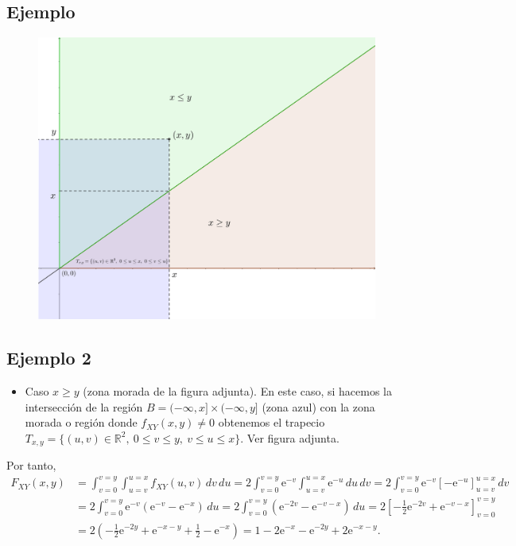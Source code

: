 \documentclass[]{book}
\providecommand{\tightlist}{%
  \setlength{\itemsep}{0pt}\setlength{\parskip}{0pt}}
\begin{document}
\hypertarget{ejemplo-53}{%
\subsection{Ejemplo}\label{ejemplo-53}}

\begin{figure}
\includegraphics[width=700px]{Images/Ejemplo2Bidi3} \end{figure}

\hypertarget{ejemplo-2-4}{%
\subsection{Ejemplo 2}\label{ejemplo-2-4}}

\begin{itemize}
\tightlist
\item
  Caso \(x\geq y\) (zona morada de la figura adjunta). En este caso, si hacemos la intersección de la región \(B=(-\infty,x]\times (-\infty,y]\) (zona azul) con la zona morada o región donde \(f_{XY}(x,y)\neq 0\) obtenemos el trapecio \(T_{x,y}=\{(u,v)\in\mathbb{R}^2,\ 0\leq v\leq y,\ v\leq u\leq x\}.\) Ver figura adjunta.
\end{itemize}

Por tanto,
\[
\begin{array}{rl}
F_{XY}(x,y) & =\int_{v=0}^{v=y}\int_{u=v}^{u=x} f_{XY}(u,v)\,dv\,du= 2 \int_{v=0}^{v=y} \mathrm{e}^{-v}\int_{u=v}^{u=x} \mathrm{e}^{-u}\,du\,dv  =
2 \int_{v=0}^{v=y} \mathrm{e}^{-v}\left[-\mathrm{e}^{-u}\right]_{u=v}^{u=x}\, dv \\ & = 2 \int_{v=0}^{v=y} \mathrm{e}^{-v} (\mathrm{e}^{-v}-\mathrm{e}^{-x})\, du =2 \int_{v=0}^{v=y} \left(\mathrm{e}^{-2v}-\mathrm{e}^{-v-x}\right)\, du=2 \left[-\frac{1}{2}\mathrm{e}^{-2v}+\mathrm{e}^{-v-x}\right]_{v=0}^{v=y}  \\ & =
2\left(-\frac{1}{2}\mathrm{e}^{-2y}+\mathrm{e}^{-x-y}+\frac{1}{2}-\mathrm{e}^{-x}\right) =1-2\mathrm{e}^{-x}-\mathrm{e}^{-2y}+2\mathrm{e}^{-x-y}.
\end{array}
\]
\end{document}
